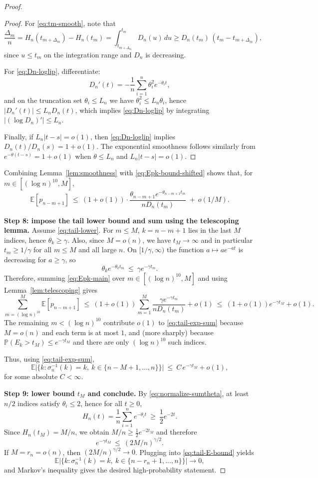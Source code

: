 \documentclass[10pt]{article}
\numberwithin{equation}{section}
\begin{document}
\begin{proof}
\begin{proof}
For \eqref{eq:tm-smooth}, note that
\[
\frac{\Delta_m}{n}
=H_n(t_{m+\Delta_m})-H_n(t_m)
=\int_{t_{m+\Delta_m}}^{t_m} D_n(u)\,du
\ge D_n(t_m)\,(t_m-t_{m+\Delta_m}),
\]
since $u\le t_m$ on the integration range and $D_n$ is decreasing.

For \eqref{eq:Dn-loglip}, differentiate:
\[
D_n'(t)= -\frac1n\sum_{i=1}^n \theta_i^2 e^{-\theta_i t},
\]
and on the truncation set $\theta_i\le L_n$ we have $\theta_i^2\le L_n\theta_i$, hence
$|D_n'(t)|\le L_n D_n(t)$, which implies \eqref{eq:Dn-loglip} by integrating $|(\log D_n)'|\le L_n$.

Finally, if $L_n|t-s|=o(1)$, then \eqref{eq:Dn-loglip} implies $D_n(t)/D_n(s)=1+o(1)$.
The exponential smoothness follows similarly from $e^{-\theta(t-s)}=1+o(1)$ when $\theta\le L_n$ and $L_n|t-s|=o(1)$.
\end{proof}

Combining Lemma~\ref{lem:smoothness} with \eqref{eq:Epk-bound-shifted} shows that, for $m\in[(\log n)^{10},M]$,
\begin{equation}\label{eq:Epk-main}
\mathbb E[p_{n-m+1}]
\ \le\ (1+o(1))\cdot \frac{\theta_{n-m+1}e^{-\theta_{n-m+1}t_m}}{nD_n(t_m)}\ +\ o(1/M).
\end{equation}

\textbf{Step 8: impose the tail lower bound and sum using the telescoping lemma.}
Assume \eqref{eq:tail-lower}. For $m\le M$, $k=n-m+1$ lies in the last $M$ indices, hence $\theta_k\ge\gamma$.
Also, since $M=o(n)$, we have $t_M\to\infty$ and in particular $t_m\ge 1/\gamma$ for all $m\le M$ and all large $n$.
On $[1/\gamma,\infty)$ the function $a\mapsto a e^{-a t}$ is decreasing for $a\ge \gamma$, so
\[
\theta_k e^{-\theta_k t_m}\ \le\ \gamma e^{-\gamma t_m}.
\]
Therefore, summing \eqref{eq:Epk-main} over $m\in[(\log n)^{10},M]$ and using Lemma~\ref{lem:telescoping} gives
\[
\sum_{m=(\log n)^{10}}^{M}\mathbb E[p_{n-m+1}]
\ \le\ (1+o(1))\sum_{m=1}^{M}\frac{\gamma e^{-\gamma t_m}}{nD_n(t_m)} + o(1)
\ \le\ (1+o(1))e^{-\gamma t_M}+o(1).
\]
The remaining $m<(\log n)^{10}$ contribute $o(1)$ to \eqref{eq:tail-exp-sum} because $M=o(n)$ and each term is at most $1$,
and (more sharply) because $\mathbb P(E_k>t_M)\le e^{-\gamma t_M}$ and there are only $(\log n)^{10}$ such indices.

Thus, using \eqref{eq:tail-exp-sum},
\begin{equation}\label{eq:tail-E-bound}
\mathbb E\Big|\{k:\sigma_n^{-1}(k)=k,\ k\in\{n-M+1,\dots,n\}\}\Big|
\ \le\ C\,e^{-\gamma t_M}+o(1),
\end{equation}
for some absolute $C<\infty$.

\textbf{Step 9: lower bound $t_M$ and conclude.}
By \eqref{eq:normalize-sumtheta}, at least $n/2$ indices satisfy $\theta_i\le 2$, hence for all $t\ge0$,
\[
H_n(t)=\frac1n\sum_{i=1}^n e^{-\theta_i t}\ \ge\ \frac12 e^{-2t}.
\]
Since $H_n(t_M)=M/n$, we obtain $M/n \ge \frac12 e^{-2t_M}$ and therefore
\[
e^{-\gamma t_M}\ \le\ (2M/n)^{\gamma/2}.
\]
If $M=r_n=o(n)$, then $(2M/n)^{\gamma/2}\to0$.
Plugging into \eqref{eq:tail-E-bound} yields
\[
\mathbb E\Big|\{k:\sigma_n^{-1}(k)=k,\ k\in\{n-r_n+1,\dots,n\}\}\Big|\to0,
\]
and Markov's inequality gives the desired high-probability statement.
\end{proof}


     
     \footnotesize


\end{document}
